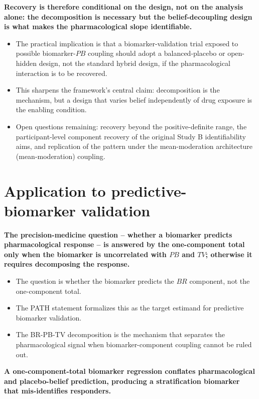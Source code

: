 \documentclass[
  11pt,
]{article}
\begin{document}
\textbf{Recovery is therefore conditional on the design, not on the analysis alone: the decomposition is necessary but the belief-decoupling design is what makes the pharmacological slope identifiable.}

\begin{itemize}\setlength{\itemsep}{2pt}\setlength{\parskip}{0pt}
\item The practical implication is that a biomarker-validation trial exposed to possible biomarker-$PB$ coupling should adopt a balanced-placebo or open-hidden design, not the standard hybrid design, if the pharmacological interaction is to be recovered.
\item This sharpens the framework's central claim: decomposition is the mechanism, but a design that varies belief independently of drug exposure is the enabling condition.
\item Open questions remaining: recovery beyond the positive-definite range, the participant-level component recovery of the original Study B identifiability aims, and replication of the pattern under the mean-moderation architecture (mean-moderation) coupling.
\end{itemize}

\section{Application to predictive-biomarker validation}\label{application-to-predictive-biomarker-validation}

\textbf{The precision-medicine question -- whether a biomarker predicts pharmacological response -- is answered by the one-component total only when the biomarker is uncorrelated with $PB$ and $TV$; otherwise it requires decomposing the response.}

\begin{itemize}\setlength{\itemsep}{2pt}\setlength{\parskip}{0pt}
\item The question is whether the biomarker predicts the $BR$ component, not the one-component total.
\item The PATH statement formalizes this as the target estimand for predictive biomarker validation.
\item The BR-PB-TV decomposition is the mechanism that separates the pharmacological signal when biomarker-component coupling cannot be ruled out.
\end{itemize}

\textbf{A one-component-total biomarker regression conflates pharmacological and placebo-belief prediction, producing a stratification biomarker that mis-identifies responders.}
\end{document}
